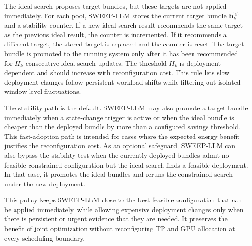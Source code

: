 The ideal search proposes target bundles, but these targets are not applied immediately.
For each pool, SWEEP-LLM stores the current target bundle $\mathbf{b}^{\mathrm{tgt}}_k$ and a stability counter.
If a new ideal-search result recommends the same target as the previous ideal result, the counter is incremented.
If it recommends a different target, the stored target is replaced and the counter is reset.
The target bundle is promoted to the running system only after it has been recommended for $H_k$ consecutive ideal-search updates.
The threshold $H_k$ is deployment-dependent and should increase with reconfiguration cost.
This rule lets slow deployment changes follow persistent workload shifts while filtering out isolated window-level fluctuations.

The stability path is the default.
SWEEP-LLM may also promote a target bundle immediately when a state-change trigger is active or when the ideal bundle is cheaper than the deployed bundle by more than a configured savings threshold.
This fast-adoption path is intended for cases where the expected energy benefit justifies the reconfiguration cost.
As an optional safeguard, SWEEP-LLM can also bypass the stability test when the currently deployed bundles admit no feasible constrained configuration but the ideal search finds a feasible deployment.
In that case, it promotes the ideal bundles and reruns the constrained search under the new deployment.

This policy keeps SWEEP-LLM close to the best feasible configuration that can be applied immediately, while allowing expensive deployment changes only when there is persistent or urgent evidence that they are needed.
It preserves the benefit of joint optimization without reconfiguring TP and GPU allocation at every scheduling boundary.
